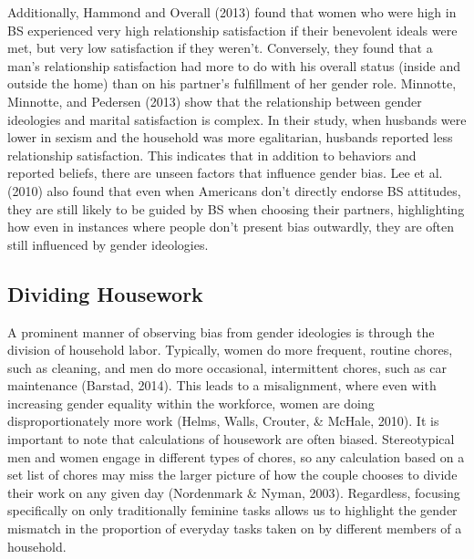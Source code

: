 \documentclass[
  man]{apa6}
\begin{document}
Additionally, Hammond and Overall (2013) found that women who were high in BS experienced very high relationship satisfaction if their benevolent ideals were met, but very low satisfaction if they weren't. Conversely, they found that a man's relationship satisfaction had more to do with his overall status (inside and outside the home) than on his partner's fulfillment of her gender role. Minnotte, Minnotte, and Pedersen (2013) show that the relationship between gender ideologies and marital satisfaction is complex. In their study, when husbands were lower in sexism and the household was more egalitarian, husbands reported less relationship satisfaction. This indicates that in addition to behaviors and reported beliefs, there are unseen factors that influence gender bias. Lee et al. (2010) also found that even when Americans don't directly endorse BS attitudes, they are still likely to be guided by BS when choosing their partners, highlighting how even in instances where people don't present bias outwardly, they are often still influenced by gender ideologies.

\hypertarget{dividing-housework}{%
\subsection{Dividing Housework}\label{dividing-housework}}

A prominent manner of observing bias from gender ideologies is through the division of household labor. Typically, women do more frequent, routine chores, such as cleaning, and men do more occasional, intermittent chores, such as car maintenance (Barstad, 2014). This leads to a misalignment, where even with increasing gender equality within the workforce, women are doing disproportionately more work (Helms, Walls, Crouter, \& McHale, 2010). It is important to note that calculations of housework are often biased. Stereotypical men and women engage in different types of chores, so any calculation based on a set list of chores may miss the larger picture of how the couple chooses to divide their work on any given day (Nordenmark \& Nyman, 2003). Regardless, focusing specifically on only traditionally feminine tasks allows us to highlight the gender mismatch in the proportion of everyday tasks taken on by different members of a household.
\end{document}
